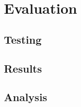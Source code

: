 \chapter{Evaluation}
\label{chap:Evaluation}

\section{Testing}

\section{Results}
\section{Analysis}